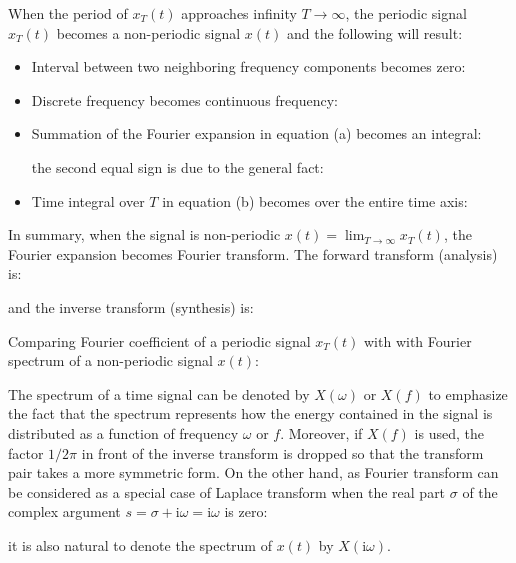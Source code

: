 	
	When the period of $x_T(t)$ approaches infinity $T \rightarrow \infty $, the 
	periodic signal $x_T(t)$ becomes a non-periodic signal $x(t)$ and the following 
	will result:
	\begin{itemize}
	
	\item Interval between two neighboring frequency components becomes zero:
	
	
	\item Discrete frequency becomes continuous frequency:
	
	
	\item Summation of the Fourier expansion in equation (a) becomes an integral:
	
	the second equal sign is due to the general fact:
	
	
	\item Time integral over $T$ in equation (b) becomes over the entire time axis:
	
	\end{itemize}
	
	In summary, when the signal is non-periodic $x(t)=\lim_{T\rightarrow \infty}x_T(t)$, the Fourier expansion becomes Fourier transform. The forward transform (analysis) is:
	
	and the inverse transform (synthesis) is:
	
	
	Comparing Fourier coefficient of a periodic signal $x_T(t)$ with with Fourier spectrum of a non-periodic signal $x(t)$:
	
		
	The spectrum of a time signal can be denoted by $X(\omega)$ or $X(f)$ to emphasize the fact that the spectrum represents how the energy contained in the signal is distributed as a function of frequency $\omega$ or $f$. Moreover, if $X(f)$ is used, the factor $1/2\pi$ in front of the inverse transform is dropped so that the transform pair takes a more symmetric form. On the other hand, as Fourier transform can be considered as a special case  of Laplace transform when the real part $\sigma$ of the complex argument $s=\sigma+\mathrm{i}\omega=\mathrm{i}\omega$ is zero:
	
	it is also natural to denote the spectrum of $x(t)$ by $X(\mathrm{i}\omega)$.
	
